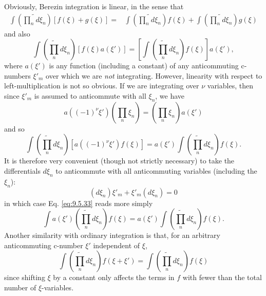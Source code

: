 Obviously, Berezin integration is linear, in the sense that
\begin{align}
\int\left(\widetilde{\prod_n}d\xi_n\right)[f(\xi)+g(\xi)]
={}&\int\left(\widetilde{\prod_n}d\xi_n\right)f(\xi)
+\int\left(\widetilde{\prod_n}d\xi_n\right)g(\xi)
\tag{9.5.31}\label{eq:9.5.31}
\end{align}
and also
\begin{equation}
\int\left(\widetilde{\prod_n}d\xi_n\right)[f(\xi)a(\xi')]
=\left[\int\left(\widetilde{\prod_n}d\xi_n\right)f(\xi)\right]a(\xi'),
\tag{9.5.32}\label{eq:9.5.32}
\end{equation}
where $a(\xi')$ is any function (including a constant) of any anticommuting
c-numbers $\xi'_m$ over which we are \emph{not} integrating. However, linearity
with respect to left-multiplication is not so obvious. If we are integrating
over $\nu$ variables, then since $\xi'_m$ is assumed to anticommute with all
$\xi_n$, we have
\[
a((-1)^\nu\xi')\left(\prod_n\xi_n\right)
=\left(\prod_n\xi_n\right)a(\xi')
\]
and so
\begin{equation}
\int\left(\widetilde{\prod_n}d\xi_n\right)
[a((-1)^\nu\xi')f(\xi)]
=a(\xi')\int\left(\widetilde{\prod_n}d\xi_n\right)f(\xi).
\tag{9.5.33}\label{eq:9.5.33}
\end{equation}
It is therefore very convenient (though not strictly necessary) to take the
differentials $d\xi_n$ to anticommute with all anticommuting variables
(including the $\xi_n$):
\begin{equation}
(d\xi_n)\xi'_m+\xi'_m(d\xi_n)=0
\tag{9.5.34}\label{eq:9.5.34}
\end{equation}
in which case Eq. \eqref{eq:9.5.33} reads more simply
\begin{equation}
\int a(\xi')\left(\widetilde{\prod_n}d\xi_n\right)f(\xi)
=a(\xi')\int\left(\widetilde{\prod_n}d\xi_n\right)f(\xi).
\tag{9.5.35}\label{eq:9.5.35}
\end{equation}
Another similarity with ordinary integration is that, for an arbitrary
anticommuting c-number $\xi'$ independent of $\xi$,
\begin{equation}
\int\left(\widetilde{\prod_n}d\xi_n\right)f(\xi+\xi')
=\int\left(\widetilde{\prod_n}d\xi_n\right)f(\xi)
\tag{9.5.36}\label{eq:9.5.36}
\end{equation}
since shifting $\xi$ by a constant only affects the terms in $f$ with fewer
than the total number of $\xi$-variables.


